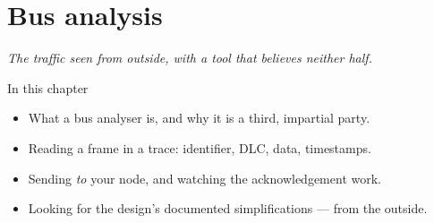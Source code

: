 \chapter{Bus analysis}
\label{ch:analys}


{\large\itshape The traffic seen from outside, with a tool that believes neither half.\par}

\begin{chapterbox}{In this chapter}
\begin{itemize}
  \item What a bus analyser is, and why it is a third, impartial party.
  \item Reading a frame in a trace: identifier, DLC, data, timestamps.
  \item Sending \emph{to} your node, and watching the acknowledgement work.
  \item Looking for the design's documented simplifications --- from the outside.
\end{itemize}
\end{chapterbox}




